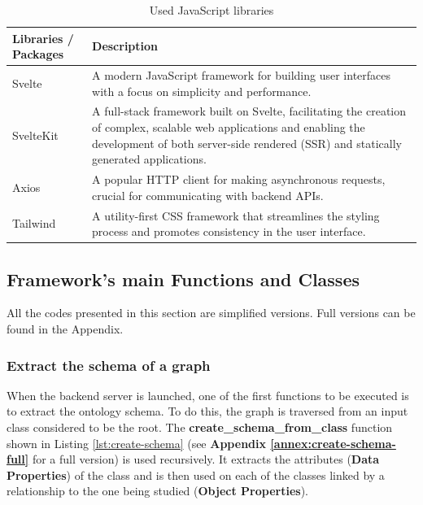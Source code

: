        \begin{table}[h]
            \centering
    	    {
    	    \begin{tabular}{ | m{2.5cm} | m{12cm} | }
                \hline
                \rowcolor{teal!30} Libraries / Packages & Description \\
                
                \hline
                Svelte & A modern JavaScript framework for building user interfaces with a focus on simplicity and performance. \\

                \hline
                SvelteKit & A full-stack framework built on Svelte, facilitating the creation of complex, scalable web applications and enabling the development of both server-side rendered (SSR) and statically generated applications. \\

                \hline
                Axios & A popular HTTP client for making asynchronous requests, crucial for communicating with backend APIs. \\

                \hline
                Tailwind & A utility-first CSS framework that streamlines the styling process and promotes consistency in the user interface.\\

                \hline
            \end{tabular}}
            \caption{\label{tab:js-libs} Used JavaScript libraries}
        \end{table}
        
\subsection{Framework's main Functions and Classes}
All the codes presented in this section are simplified versions. Full versions can be found in the Appendix.\\

\subsubsection{Extract the schema of a graph}
 When the backend server is launched, one of the first functions to be executed is to extract the ontology schema. To do this, the graph is traversed from an input class considered to be the root. The \textbf{create\_schema\_from\_class} function shown in Listing \ref{lst:create-schema} (see \textbf{Appendix \ref{annex:create-schema-full}} for a full version) is used recursively. It extracts the attributes (\textbf{Data Properties}) of the class and is then used on each of the classes linked by a relationship to the one being studied (\textbf{Object Properties}).\\

